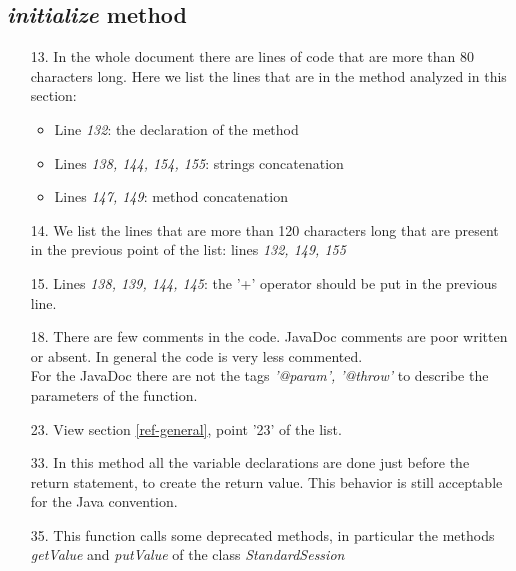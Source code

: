 \subsection{\textit{initialize} method}

\begin{itemize}
        \item[13.] In the whole document there are lines of code that are more than 80 characters long. 
        \newline
        Here we list the lines that are in the method analyzed in this section:
            \begin{itemize}
                \item Line \textit{132}: the declaration of the method
                \item Lines \textit{138, 144, 154, 155}: strings concatenation
                \item Lines \textit{147, 149}: method concatenation
            \end{itemize}
    \item[14.] We list the lines that are more than 120 characters long that are present in the previous point of the list: lines \textit{132, 149, 155}
    \item[15.] Lines \textit{138, 139, 144, 145}: the '+' operator should be put in the previous line.
    \item[18.] There are few comments in the code. JavaDoc comments are poor written or absent. In general the code is very less commented.\\
    For the JavaDoc there are not the tags \textit{'@param', '@throw'} to describe the parameters of the function.
    \item[23.] View section \ref{ref-general}, point '23' of the list.
    \item[33.] In this method all the variable declarations are done just before the return statement, to create the return value. This behavior is still acceptable for the Java convention.
    \item[35.] This function calls some deprecated methods, in particular the methods \textit{getValue} and \textit{putValue} of the class \textit{StandardSession}
\end{itemize}